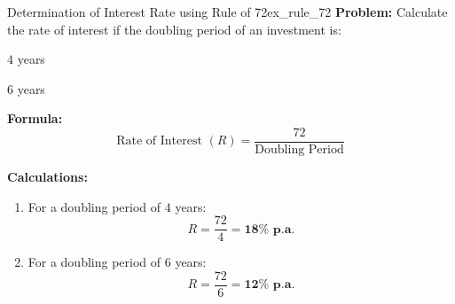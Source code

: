 \begin{example}{Determination of Interest Rate using Rule of 72}{ex_rule_72}
\textbf{Problem:}
Calculate the rate of interest if the doubling period of an investment is:
\begin{enumerate*}[label=(\alph*), itemjoin=\qquad]
    \item $4$ years
    \item $6$ years
\end{enumerate*}

\tcbline
\textbf{Formula:}
\begin{equation*}
    \text{Rate of Interest } (R) = \frac{72}{\text{Doubling Period}}
\end{equation*}

\textbf{Calculations:}
\begin{enumerate}[leftmargin=*]
    \item For a doubling period of $4$ years:
    \begin{equation*}
        R = \frac{72}{4} = \mathbf{18\% \text{ p.a.}}
    \end{equation*}

    \item For a doubling period of $6$ years:
    \begin{equation*}
        R = \frac{72}{6} = \mathbf{12\% \text{ p.a.}}
    \end{equation*}
\end{enumerate}
\end{example}


